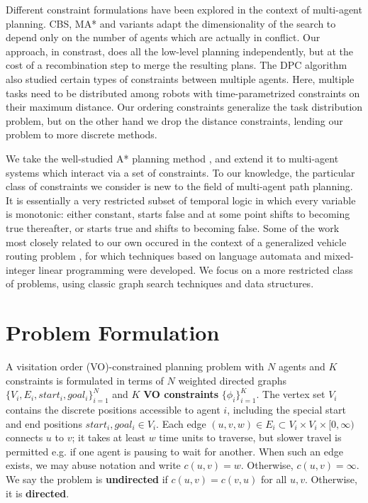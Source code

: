 \documentclass[letterpaper]{article}
\begin{document}
Different constraint formulations have been explored in the context of multi-agent planning. CBS, MA* and variants \cite{ferner2013odrm}\cite{sharon2015conflict}  adapt the dimensionality of the search to depend only on the number of agents which are actually in conflict. Our approach, in constrast, does all the low-level planning independently, but at the cost of a recombination step to merge the resulting plans. The DPC algorithm \cite{bhattacharya2010multi} also studied certain types of constraints between multiple agents. Here, multiple tasks need to be distributed among robots with time-parametrized constraints on their maximum distance. Our ordering constraints generalize the task distribution problem, but on the other hand we drop the distance constraints, lending our problem to more discrete methods.

We take the well-studied A* planning method \cite{hart1968formal}, and extend it to multi-agent systems which interact via a set of constraints. To our knowledge, the particular class of constraints we consider is new to the field of multi-agent path planning. It is essentially a very restricted subset of temporal logic \cite{gabbay1994temporal} in which every variable is monotonic: either constant, starts false and at some point shifts to becoming true thereafter, or starts true and shifts to becoming false. Some of the work most closely related to our own occured in the context of a generalized vehicle routing problem \cite{karaman2011linear}, for which techniques based on language automata and mixed-integer linear programming were developed. We focus on a more restricted class of problems, using classic graph search techniques and data structures.

\section{Problem Formulation}

A visitation order (VO)-constrained planning problem with $N$ agents and $K$ constraints is formulated in terms of $N$ weighted directed graphs $\{V_i,E_i,start_i,goal_i\}_{i=1}^N$ and $K$ \textbf{VO constraints} $\{\phi_i\}_{i=1}^K$. The vertex set $V_i$ contains the discrete positions accessible to agent $i$, including the special start and end positions $start_i,goal_i\in V_i$. Each edge $(u,v,w)\in E_i \subset V_i\times V_i\times [0,\infty)$ connects $u$ to $v$; it takes at least $w$ time units to traverse, but slower travel is permitted e.g. if one agent is pausing to wait for another. When such an edge exists, we may abuse notation and write $c(u,v) = w$. Otherwise, $c(u,v) = \infty$. We say the problem is \textbf{undirected} if $c(u,v) = c(v,u)$ for all $u,v$. Otherwise, it is \textbf{directed}.
\end{document}
